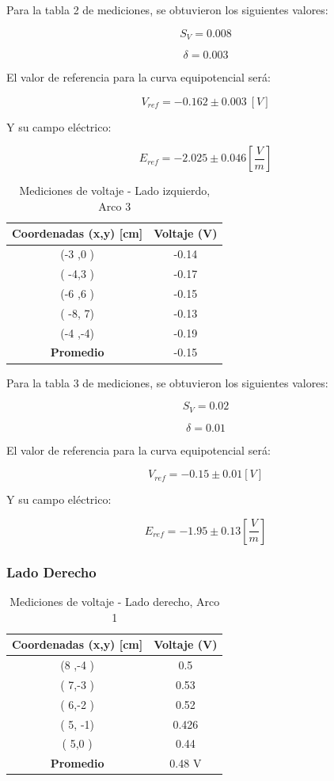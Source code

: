 \documentclass[11pt,twocolumn]{article}
\begin{document}
Para la tabla 2 de mediciones, se obtuvieron los siguientes valores:

\[S_V = 0.008\]

\[\delta = 0.003\]

El valor de referencia para la curva equipotencial será:

\[V_{ref} = -0.162 \pm 0.003\ [V]\]

Y su campo eléctrico:

\[E_{ref} = -2.025 \pm 0.046 [\frac{V}{m}]\]

\begin{table}[h]
\centering
\caption{Mediciones de voltaje - Lado izquierdo, Arco 3}
\begin{tabular}{cc}
\toprule
\textbf{Coordenadas (x,y) [cm]} & \textbf{Voltaje (V)} \\
\midrule
(-3 ,0 ) & -0.14 \\
( -4,3 ) & -0.17 \\
(-6 ,6 ) & -0.15 \\
( -8, 7) & -0.13 \\
(-4 ,-4) & -0.19 \\
\midrule
\textbf{Promedio} &  -0.15\\
\bottomrule
\end{tabular}
\end{table}

Para la tabla 3 de mediciones, se obtuvieron los siguientes valores:

\[S_V = 0.02\]

\[\delta = 0.01\]

El valor de referencia para la curva equipotencial será:

\[V_{ref} = -0.15 \pm 0.01 [V] \]

Y su campo eléctrico:

\[E_{ref} = -1.95 \pm 0.13 [\frac{V}{m}]\]

\subsubsection*{Lado Derecho}

\begin{table}[h]
\centering
\caption{Mediciones de voltaje - Lado derecho, Arco 1}
\begin{tabular}{cc}
\toprule
\textbf{Coordenadas (x,y) [cm]} & \textbf{Voltaje (V)} \\
\midrule
(8 ,-4 ) & 0.5 \\
( 7,-3 ) & 0.53 \\
( 6,-2 ) & 0.52 \\
( 5, -1) &  0.426\\
( 5,0 ) & 0.44 \\
\midrule
\textbf{Promedio} &  0.48 V\\
\bottomrule
\end{tabular}
\end{table}
\end{document}
